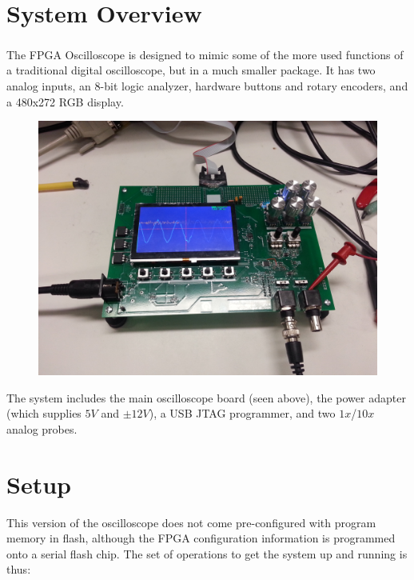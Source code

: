 \section{System Overview}
The FPGA Oscilloscope \textsuperscript{\textregistered} is designed to mimic some of the more used functions of a traditional digital oscilloscope, but in a much smaller package. It has two analog inputs, an 8-bit logic analyzer, hardware buttons and rotary encoders, and a 480x272 RGB display.

\begin{figure}[ht!]
    \centering
    \includegraphics[width=6in]{images/osc_full.jpg}
\end{figure}

The system includes the main oscilloscope board (seen above), the power adapter (which supplies $5V$ and $\pm 12V$), a USB JTAG programmer, and two $1x$/$10x$ analog probes.

\section{Setup}
This version of the oscilloscope does not come pre-configured with program memory in flash, although the FPGA configuration information is programmed onto a serial flash chip. The set of operations to get the system up and running is thus:


